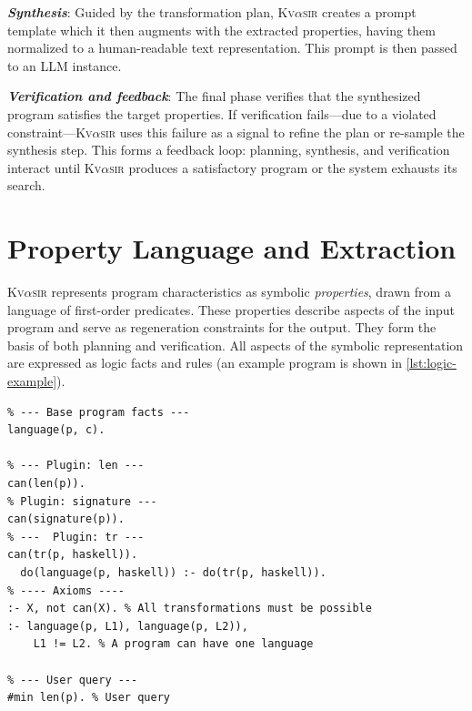\documentclass[nonacm,sigplan,review]{acmart}
\def\eg{{\em e.g.}, }
\newcommand{\sys}{{\scshape Kv{$\alpha$}sir}\xspace}
\newcommand{\heading}[1]{\vspace{2pt}\noindent\textbf{\emph{#1}}:\enspace}
\newcommand{\ttt}[1]{\texttt{#1}\xspace}
\begin{document}
\heading{Synthesis}
Guided by the transformation plan, \sys creates a prompt template which it then
augments with the extracted properties, having them normalized to a human-readable text representation.
This prompt is then passed to an LLM instance.

\heading{Verification and feedback}
The final phase verifies that the
synthesized program satisfies the target properties.
If verification fails---due to a violated constraint---\sys uses this
failure as a signal to refine the plan or re-sample the synthesis step.
This forms a feedback loop: planning, synthesis, and verification interact until \sys
produces a satisfactory program or the system exhausts its search.

\section{Property Language and Extraction}
\label{sec:dsl}

\sys represents program characteristics as symbolic \emph{properties}, drawn from a language of first-order predicates.
These properties describe aspects of the input program and serve as regeneration constraints for the output.
They form the basis of both planning and verification.
All aspects of the symbolic representation are expressed as logic facts and rules (an example program is shown in \cref{lst:logic-example}).

\begin{listing}[t]
  \begin{verbatim}
% --- Base program facts ---
language(p, c).

% --- Plugin: len ---
can(len(p)). 
% Plugin: signature ---
can(signature(p)).
% ---  Plugin: tr ---
can(tr(p, haskell)).
  do(language(p, haskell)) :- do(tr(p, haskell)).
% ---- Axioms ----
:- X, not can(X). % All transformations must be possible
:- language(p, L1), language(p, L2)),
    L1 != L2. % A program can have one language

% --- User query ---
#min len(p). % User query
\end{verbatim}
  \caption{\textbf{Example \sys logic program.}
  This is a lightly simplified version of the logic program that produces the plan for the idiomatization task in \cref{sec:example}. 
  The program contains facts coming from (1) the input program (written in C),
  (2) three plugins (\ttt{len}, \ttt{signature}, and \ttt{tr}),
  (3) axioms from the logic engine (\eg a program can have one language, an analysis will be applied only if possible, all goals must be satisfied), and
  (4) the user query (the user wants to minimize the program's length).
  }
  \label{lst:logic-example}
\end{listing}
\end{document}
